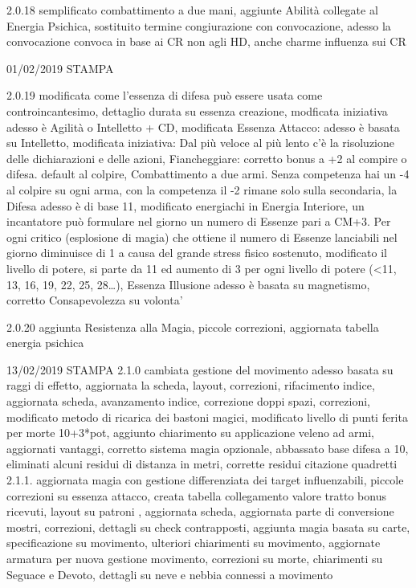 \documentclass[a4paper,11pt,twoside,openany]{book}
\begin{document}
{{2.0.18 semplificato combattimento a due mani, aggiunte Abilità collegate al Energia Psichica, sostituito termine congiurazione con convocazione, adesso la convocazione convoca in base ai CR non agli HD, anche charme influenza sui CR

01/02/2019 STAMPA

2.0.19 modificata come l'essenza di difesa può essere usata come controincantesimo, dettaglio durata su essenza creazione, modficata iniziativa adesso è Agilità o Intelletto + CD, modificata Essenza Attacco: adesso è basata su Intelletto, modificata iniziativa: Dal più veloce al più lento c'è la risoluzione delle dichiarazioni e delle azioni, Fiancheggiare: corretto bonus a +2 al compire o difesa. default al colpire, Combattimento a due armi. Senza competenza hai un -4 al colpire su ogni arma, con la competenza il -2 rimane solo sulla secondaria, la Difesa adesso è di base 11, modificato energiachi in Energia Interiore, un incantatore può formulare nel giorno un numero di Essenze pari a CM+3. Per ogni critico (esplosione di magia) che ottiene il numero di Essenze lanciabili nel giorno diminuisce di 1 a causa del grande stress fisico sostenuto, modificato il livello di potere, si parte da 11 ed aumento di 3 per ogni livello di potere (\textless11, 13, 16, 19, 22, 25, 28\ldots ), Essenza Illusione adesso è basata su magnetismo, corretto Consapevolezza su volonta'

2.0.20 aggiunta Resistenza alla Magia, piccole correzioni, aggiornata tabella energia psichica

13/02/2019 STAMPA
2.1.0 cambiata gestione del movimento adesso basata su raggi di effetto, aggiornata la scheda, layout, correzioni, rifacimento indice, aggiornata scheda, avanzamento indice, correzione doppi spazi, correzioni, modificato metodo di ricarica dei bastoni magici, modificato livello di punti ferita per morte 10+3*pot, aggiunto chiarimento su applicazione veleno ad armi, aggiornati vantaggi, corretto sistema magia opzionale, abbassato base difesa a 10, eliminati alcuni residui di distanza in metri, corrette residui citazione quadretti 2.1.1. aggiornata magia con gestione differenziata dei target influenzabili, piccole correzioni su essenza attacco, creata tabella collegamento valore tratto bonus ricevuti, layout su patroni , aggiornata scheda, aggiornata parte di conversione mostri, correzioni, dettagli su check contrapposti, aggiunta magia basata su carte, specificazione su movimento, ulteriori chiarimenti su movimento, aggiornate armatura per nuova gestione movimento, correzioni su morte, chiarimenti su Seguace e Devoto, dettagli su neve e nebbia connessi a movimento

}}
\end{document}
